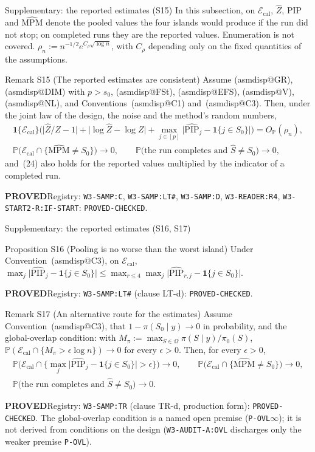 \documentclass[aspectratio=169]{beamer}
\makeatletter
\newcommand{\asmdisp}[1]{\csname asmdisp@#1\endcsname}
\newcommand{\as}[1]{\textup{(\asmdisp{#1})}}
\newcommand{\ind}[1]{\mathbf{1}\{#1\}}
\newcommand{\set}[1]{[#1]}
\newcommand{\abs}[1]{\lvert #1\rvert}
\renewcommand{\P}{\mathbb{P}}
\newcommand{\OP}{O_{\P}}
\newcommand{\Sz}{S_0}
\newcommand{\sz}{s_0}
\newcommand{\Om}{\Omega}
\newcommand{\pis}[1]{\pi(#1\mid y)}
\newcommand{\Shat}{\hat S}
\newcommand{\Zhat}{\hat Z}
\newcommand{\PIPhat}{\widehat{\mathrm{PIP}}}
\newcommand{\MPMhat}{\widehat{\mathrm{MPM}}}
\newcommand{\Acal}{\mathcal E_{\mathrm{cal}}}
\newcommand{\rid}[1]{\texttt{#1}}
\makeatother
\begin{document}
\begin{frame}{Supplementary: the reported estimates (S15)}
\footnotesize
In this subsection, on $\Acal$, $\Zhat$, $\PIPhat$ and $\MPMhat$ denote the pooled values the four islands would produce if
the run did not stop; on completed runs they are the reported values. Enumeration is not covered.
$\rho_n:=n^{-1/2}e^{C_\rho\sqrt{\log n}}$, with $C_\rho$ depending only on the fixed quantities of the assumptions.
\begin{block}{Remark S15 (The reported estimates are consistent)}
Assume \as{GR}, \as{DIM} with $p>\sz$, \as{FSt}, \as{EFS}, \as{V}, \as{NL}, and Conventions~\as{C1} and~\as{C3}. Then,
under the joint law of the design, the noise and the method's random numbers,
\begin{gather}
  \ind{\Acal}\Big(\big|\Zhat/Z-1\big|+\big|\log\Zhat-\log Z\big|+\max_{j\in\set{p}}\big|\PIPhat_j-\ind{j\in\Sz}\big|\Big)
    =\OP(\rho_n),\tag{24}\\
  \P\big(\Acal\cap\{\MPMhat\neq\Sz\}\big)\to0,\qquad \P\big(\text{the run completes and }\Shat\neq\Sz\big)\to0,
    \tag{25}
\end{gather}
and~\textup{(24)} also holds for the reported values multiplied by the indicator of a completed run.
\end{block}
{\footnotesize \textbf{PROVED}\quad Registry: \rid{W3-SAMP:C}, \rid{W3-SAMP:LT\#}, \rid{W3-SAMP:D}, \rid{W3-READER:R4}, \rid{W3-START2-R:IF-START}: \rid{PROVED-CHECKED}.}

\end{frame}

\begin{frame}{Supplementary: the reported estimates (S16, S17)}
\footnotesize
\begin{block}{Proposition S16 (Pooling is no worse than the worst island)}
Under Convention~\as{C3}, on $\Acal$,
$\max_j\big|\PIPhat_j-\ind{j\in\Sz}\big|\le\max_{r\le4}\max_j\big|\PIPhat_{r,j}-\ind{j\in\Sz}\big|$.
\end{block}
{\footnotesize \textbf{PROVED}\quad Registry: \rid{W3-SAMP:LT\#} (clause LT-d): \rid{PROVED-CHECKED}.}

\begin{block}{Remark S17 (An alternative route for the estimates)}
Assume Convention~\as{C3}, that $1-\pis{\Sz}\to0$ in probability, and the global-overlap condition: with
$M_\pi:=\max_{S\in\Om}\pis{S}/\pi_0(S)$, $\P(\Acal\cap\{M_\pi>\epsilon\log n\})\to0$ for every $\epsilon>0$. Then, for
every $\epsilon>0$,
\begin{gather*}
  \P\big(\Acal\cap\{\max_j\abs{\PIPhat_j-\ind{j\in\Sz}}>\epsilon\}\big)\to0,\qquad
  \P\big(\Acal\cap\{\MPMhat\neq\Sz\}\big)\to0,\\
  \P\big(\text{the run completes and }\Shat\neq\Sz\big)\to0 .
\end{gather*}
\end{block}
{\footnotesize \textbf{PROVED}\quad Registry: \rid{W3-SAMP:TR} (clause TR-d, production form): \rid{PROVED-CHECKED}. The global-overlap condition is a named
open premise (\rid{P-OVL}$\infty$); it is not derived from conditions on the design (\rid{W3-AUDIT-A:OVL} discharges only
the weaker premise \rid{P-OVL}).}

\end{frame}
\end{document}

